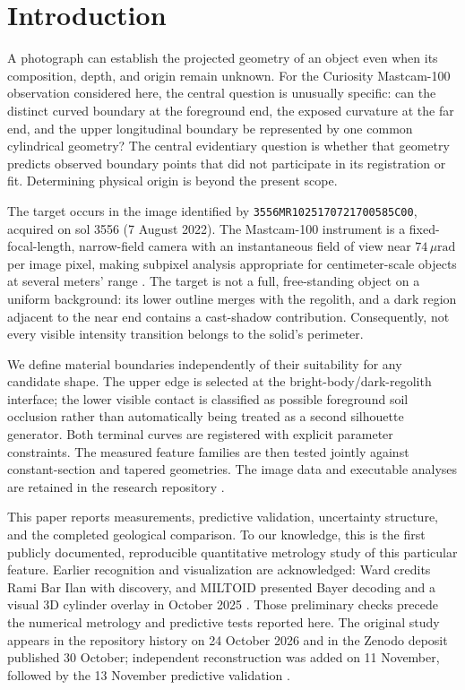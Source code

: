 \documentclass[11pt,letterpaper]{article}
\newcommand{\pdsid}{\texttt{3556MR1025170721700585C00}}
\begin{document}
\section{Introduction}
\label{sec:intro}

A photograph can establish the projected geometry of an object even when its composition, depth, and origin remain unknown. For the Curiosity Mastcam-100 observation considered here, the central question is unusually specific: can the distinct curved boundary at the foreground end, the exposed curvature at the far end, and the upper longitudinal boundary be represented by one common cylindrical geometry? The central evidentiary question is whether that geometry predicts observed boundary points that did not participate in its registration or fit. Determining physical origin is beyond the present scope.

The target occurs in the image identified by \pdsid, acquired on sol 3556 (7 August 2022). The Mastcam-100 instrument is a fixed-focal-length, narrow-field camera with an instantaneous field of view near \(74\,\mu\mathrm{rad}\) per image pixel, making subpixel analysis appropriate for centimeter-scale objects at several meters' range \cite{malin2017,bell2017}. The target is not a full, free-standing object on a uniform background: its lower outline merges with the regolith, and a dark region adjacent to the near end contains a cast-shadow contribution. Consequently, not every visible intensity transition belongs to the solid's perimeter.

We define material boundaries independently of their suitability for any candidate shape. The upper edge is selected at the bright-body/dark-regolith interface; the lower visible contact is classified as possible foreground soil occlusion rather than automatically being treated as a second silhouette generator. Both terminal curves are registered with explicit parameter constraints. The measured feature families are then tested jointly against constant-section and tapered geometries. The image data and executable analyses are retained in the research repository \cite{bogner2026repo}.

This paper reports measurements, predictive validation, uncertainty structure, and the completed geological comparison. To our knowledge, this is the first publicly documented, reproducible quantitative metrology study of this particular feature. Earlier recognition and visualization are acknowledged: Ward credits Rami Bar Ilan with discovery, and MILTOID presented Bayer decoding and a visual 3D cylinder overlay in October 2025 \cite{ward2025,miltoid2025}. Those preliminary checks precede the numerical metrology and predictive tests reported here. The original study appears in the repository history on 24 October 2026 and in the Zenodo deposit published 30 October; independent reconstruction was added on 11 November, followed by the 13 November predictive validation \cite{bogner2026deposit}.
\end{document}
